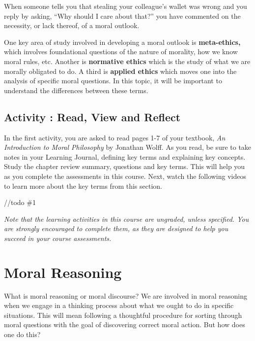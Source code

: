 \documentclass[
]{book}
\begin{document}
When someone tells you that stealing your colleague's wallet was wrong and you reply by asking, ``Why should I care about that?'' you have commented on the necessity, or lack thereof, of a moral outlook.

One key area of study involved in developing a moral outlook is \textbf{meta-ethics,} which involves foundational questions of the nature of morality, how we know moral rules, etc. Another is \textbf{normative ethics} which is the study of what we are morally obligated to do. A third is \textbf{applied ethics} which moves one into the analysis of specific moral questions. In this topic, it will be important to understand the differences between these terms.

\begin{reflect}
\hypertarget{activity-read-view-and-reflect}{%
\subsection*{Activity : Read, View and Reflect}\label{activity-read-view-and-reflect}}

In the first activity, you are asked to read pages 1-7 of your textbook, \emph{An Introduction to Moral Philosophy} by Jonathan Wolff. As you read, be sure to take notes in your Learning Journal, defining key terms and explaining key concepts. Study the chapter review summary, questions and key terms. This will help you as you complete the assessments in this course.
Next, watch the following videos to learn more about the key terms from this section.

//todo \#1
\end{reflect}

\begin{caution}
\emph{Note that the learning activities in this course are ungraded, unless specified. You are strongly encouraged to complete them, as they are designed to help you succeed in your course assessments.}
\end{caution}

\hypertarget{moral-reasoning}{%
\section*{Moral Reasoning}\label{moral-reasoning}}

What is moral reasoning or moral discourse? We are involved in moral reasoning
when we engage in a thinking process about what we ought to do in specific
situations. This will mean following a thoughtful procedure for sorting through
moral questions with the goal of discovering correct moral action. But how does
one do this?
\end{document}

